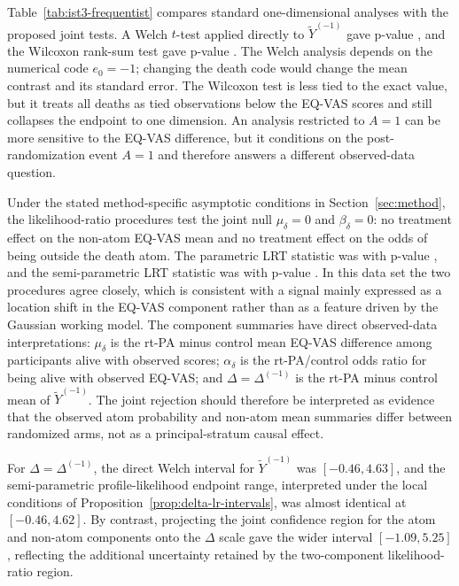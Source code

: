 \documentclass[11pt]{article}
\begin{document}
Table~\ref{tab:ist3-frequentist} compares standard one-dimensional analyses with the proposed joint tests. A Welch $t$-test applied directly to $\widetilde{Y}^{(-1)}$ gave p-value \ApplicationTTestP{}, and the Wilcoxon rank-sum test gave p-value \ApplicationWilcoxP{}. The Welch analysis depends on the numerical code $e_0=-1$; changing the death code would change the mean contrast and its standard error. The Wilcoxon test is less tied to the exact value, but it treats all deaths as tied observations below the EQ-VAS scores and still collapses the endpoint to one dimension. An analysis restricted to $A=1$ can be more sensitive to the EQ-VAS difference, but it conditions on the post-randomization event $A=1$ and therefore answers a different observed-data question.



Under the stated method-specific asymptotic conditions in Section~\ref{sec:method}, the likelihood-ratio procedures test the joint null $\mu_\delta=0$ and $\beta_\delta=0$: no treatment effect on the non-atom EQ-VAS mean and no treatment effect on the odds of being outside the death atom. The parametric LRT statistic was \ApplicationLRTStatistic{} with p-value \ApplicationLRTP{}, and the semi-parametric LRT statistic was \ApplicationSPLRTStatistic{} with p-value \ApplicationSPLRTP{}. In this data set the two procedures agree closely, which is consistent with a signal mainly expressed as a location shift in the EQ-VAS component rather than as a feature driven by the Gaussian working model. The component summaries have direct observed-data interpretations: $\mu_\delta$ is the rt-PA minus control mean EQ-VAS difference among participants alive with observed scores; $\alpha_\delta$ is the rt-PA/control odds ratio for being alive with observed EQ-VAS; and $\Delta=\Delta^{(-1)}$ is the rt-PA minus control mean of $\widetilde{Y}^{(-1)}$. The joint rejection should therefore be interpreted as evidence that the observed atom probability and non-atom mean summaries differ between randomized arms, not as a principal-stratum causal effect.

For $\Delta=\Delta^{(-1)}$, the direct Welch interval for $\widetilde{Y}^{(-1)}$ was $[-0.46, 4.63]$, and the semi-parametric profile-likelihood endpoint range, interpreted under the local conditions of Proposition~\ref{prop:delta-lr-intervals}, was almost identical at $[-0.46, 4.62]$. By contrast, projecting the joint confidence region for the atom and non-atom components onto the $\Delta$ scale gave the wider interval $[-1.09, 5.25]$, reflecting the additional uncertainty retained by the two-component likelihood-ratio region.
\end{document}
